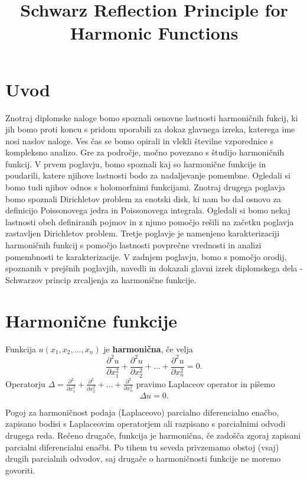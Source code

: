 \documentclass[mat1]{fmfdelo}
\title{Schwarz Reflection Principle for Harmonic Functions}
\begin{document}
\section{Uvod}
Znotraj diplomske naloge bomo spoznali osnovne lastnosti harmoničnih fukcij, ki jih bomo proti koncu s pridom uporabili za dokaz glavnega izreka, katerega ime nosi naslov naloge.
Ves čas se bomo opirali in vlekli številne vzporednice s kompleksno analizo. Gre za področje, močno povezano s študijo harmoničnih funkcij.
\newline
V prvem poglavju, bomo spoznali kaj so harmonične funkcije in poudarili, katere njihove lastnosti bodo za nadaljevanje pomembne. Ogledali si bomo tudi njihov odnos s holomorfnimi funkcijami. 
Znotraj drugega poglavja bomo spoznali Dirichletov problem za enotski disk, ki nam bo dal osnovo za definicijo Poissonovega jedra in Poissonovega integrala. Ogledali si bomo nekaj lastnosti obeh definiranih pojmov in z njuno pomočjo rešili na začetku poglavja zastavljen Dirichletov problem.
Tretje poglavje je namenjeno karakterizaciji harmoničnih funkcij s pomočjo lastnosti povprečne vrednosti in analizi pomembnosti te karakterizacije. 
V zadnjem poglavju, bomo s pomočjo orodij, spoznanih v prejšnih poglavjih, navedli in dokazali glavni izrek diplomskega dela - Schwarzov princip zrcaljenja za harmonične funkcije.
%

\newpage
\section{Harmonične funkcije}
    \begin{definicija}
        \label{harm}
        Funkcija $u(x_1, x_2, \dots, x_n)$ je \textbf{harmonična}, če velja
        $$
        \frac{\partial^2 u}{\partial x_1 ^ 2} +  \frac{\partial^2 u}{\partial x_2 ^ 2} + \dots + \frac{\partial^2 u}{\partial x_n ^ 2} = 0.
        $$
        Operatorju $\Delta  = \frac{\partial^2}{\partial x_1 ^ 2} +  \frac{\partial^2}{\partial x_2 ^ 2} + \dots + \frac{\partial^2}{\partial x_n ^ 2}$ pravimo Laplaceov operator in pišemo
        $$
        \Delta u = 0.
        $$
    \end{definicija}

    Pogoj za harmoničnost podaja (Laplaceovo) parcialno diferencialno enačbo, zapisano bodisi s Laplaceovim operatorjem ali razpisano s parcialnimi odvodi drugega reda. 
    Rečeno drugače, funkcija je harmonična, če zadošča zgoraj zapisani parcialni diferencialni enačbi. 
    Po tihem tu seveda privzemamo obstoj (vsaj) drugih parcialnih odvodov, saj drugače o harmoničnosti funkcije ne moremo govoriti.
\end{document}
